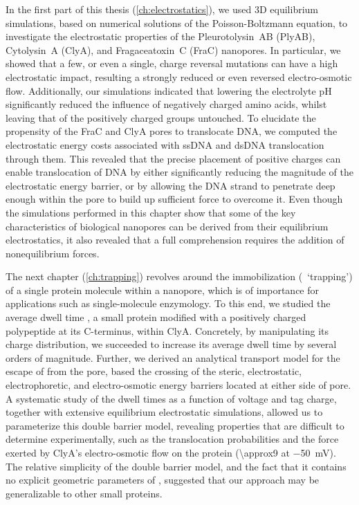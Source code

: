 In the first part of this thesis (\cref{ch:electrostatics}), we used 3D equilibrium simulations, based on
numerical solutions of the Poisson-Boltzmann equation, to investigate the electrostatic properties of the
Pleurotolysin~AB (PlyAB), Cytolysin~A (ClyA), and Fragaceatoxin~C (FraC) nanopores. In particular, we showed
that a few, or even a single, charge reversal mutations can have a high electrostatic impact, resulting a
strongly reduced or even reversed electro-osmotic flow. Additionally, our simulations indicated that lowering
the electrolyte pH significantly reduced the influence of negatively charged amino acids, whilst leaving that
of the positively charged groups untouched. To elucidate the propensity of the FraC and ClyA pores to
translocate DNA, we computed the electrostatic energy costs associated with ssDNA and dsDNA translocation
through them. This revealed that the precise placement of positive charges can enable translocation of DNA by
either significantly reducing the magnitude of the electrostatic energy barrier, or by allowing the DNA strand
to penetrate deep enough within the pore to build up sufficient force to overcome it. Even though the
simulations performed in this chapter show that some of the key characteristics of biological nanopores can be
derived from their equilibrium electrostatics, it also revealed that a full comprehension requires the
addition of nonequilibrium forces.

The next chapter (\cref{ch:trapping}) revolves around the immobilization (\ie~`trapping') of a single protein
molecule within a nanopore, which is of importance for applications such as single-molecule enzymology. To
this end, we studied the average dwell time \DHFRt{}, a small protein modified with a positively charged
polypeptide at its C-terminus, within ClyA. Concretely, by manipulating its charge distribution, we succeeded
to increase its average dwell time by several orders of magnitude. Further, we derived an analytical transport
model for the escape of \DHFRt{} from the pore, based the crossing of the steric, electrostatic,
electrophoretic, and electro-osmotic energy barriers located at either side of pore. A systematic study of the
dwell times as a function of voltage and tag charge, together with extensive equilibrium electrostatic
simulations, allowed us to parameterize this double barrier model, revealing properties that are difficult to
determine experimentally, such as the translocation probabilities and the force exerted by ClyA's
electro-osmotic flow on the protein (\SI{\approx9}{\pN} at \SI{-50}{\mV}). The relative simplicity of the
double barrier model, and the fact that it contains no explicit geometric parameters of \DHFRt{}, suggested
that our approach may be generalizable to other small proteins.

